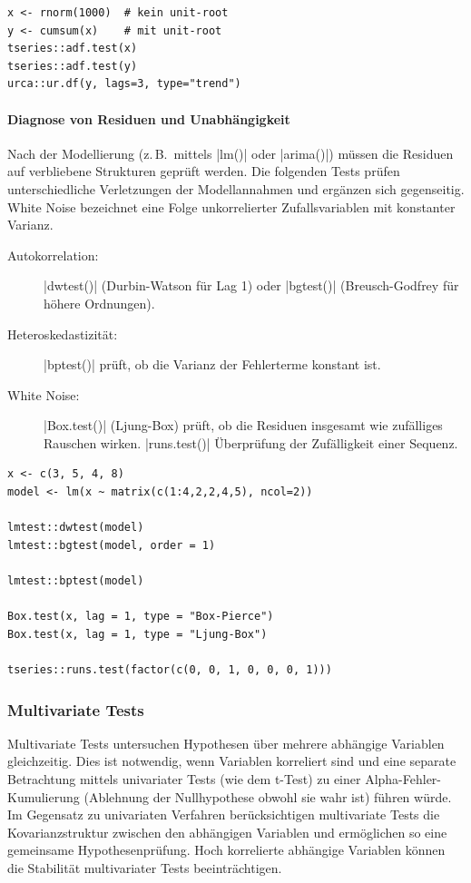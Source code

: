 \documentclass[10pt,twocolumn]{scrartcl}
\renewcommand{\lstinline}{\mycoloredinline}
\begin{document}
\begin{lstlisting}
x <- rnorm(1000)  # kein unit-root
y <- cumsum(x)    # mit unit-root
tseries::adf.test(x)
tseries::adf.test(y)
urca::ur.df(y, lags=3, type="trend")
\end{lstlisting}

\paragraph{Diagnose von Residuen und Unabhängigkeit}

Nach der Modellierung (z.\,B.\ mittels \lstinline|lm()| oder \lstinline|arima()|) müssen die Residuen auf verbliebene Strukturen geprüft werden.
Die folgenden Tests prüfen unterschiedliche Verletzungen der Modellannahmen und ergänzen sich gegenseitig.
White Noise bezeichnet eine Folge unkorrelierter Zufallsvariablen mit konstanter Varianz.

\begin{description}
\item[Autokorrelation:] \lstinline|dwtest()| (Durbin-Watson für Lag 1) oder \lstinline|bgtest()| (Breusch-Godfrey für höhere Ordnungen).
\item[Heteroskedastizität:] \lstinline|bptest()| prüft, ob die Varianz der Fehlerterme konstant ist.
\item[White Noise:] \lstinline|Box.test()| (Ljung-Box) prüft, ob die Residuen insgesamt wie zufälliges Rauschen wirken. \lstinline|runs.test()| Überprüfung der Zufälligkeit einer Sequenz.
\end{description}


\begin{lstlisting}
x <- c(3, 5, 4, 8)
model <- lm(x ~ matrix(c(1:4,2,2,4,5), ncol=2))

lmtest::dwtest(model)
lmtest::bgtest(model, order = 1)

lmtest::bptest(model)

Box.test(x, lag = 1, type = "Box-Pierce")
Box.test(x, lag = 1, type = "Ljung-Box")

tseries::runs.test(factor(c(0, 0, 1, 0, 0, 0, 1)))
\end{lstlisting}


\subsubsection{Multivariate Tests}

Multivariate Tests untersuchen Hypothesen über mehrere abhängige Variablen gleichzeitig. Dies ist notwendig, wenn Variablen korreliert sind und eine separate Betrachtung mittels univariater Tests (wie dem t-Test) zu einer Alpha-Fehler-Kumulierung (Ablehnung der Nullhypothese obwohl sie wahr ist) führen würde. Im Gegensatz zu univariaten Verfahren berücksichtigen multivariate Tests die Kovarianzstruktur zwischen den abhängigen Variablen und ermöglichen so eine gemeinsame Hypothesenprüfung. Hoch korrelierte abhängige Variablen können die Stabilität multivariater Tests beeinträchtigen.
\end{document}
